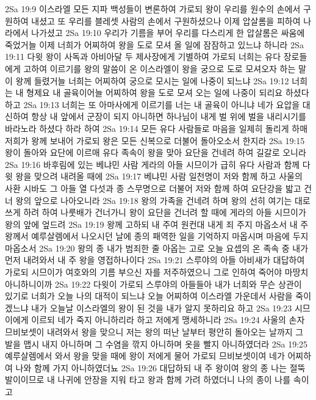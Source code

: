 2Sa 19:9  이스라엘 모든 지파 백성들이 변론하여 가로되 왕이 우리를 원수의 손에서 구원하여 내셨고 또 우리를 블레셋 사람의 손에서 구원하셨으나 이제 압살롬을 피하여 나라에서 나가셨고
2Sa 19:10  우리가 기름을 부어 우리를 다스리게 한 압살롬은 싸움에 죽었거늘 이제 너희가 어찌하여 왕을 도로 모셔 올 일에 잠잠하고 있느냐 하니라
2Sa 19:11  다윗 왕이 사독과 아비아달 두 제사장에게 기별하여 가로되 너희는 유다 장로들에게 고하여 이르기를 왕의 말씀이 온 이스라엘이 왕을 궁으로 도로 모셔오자 하는 말이 왕께 들렸거늘 너희는 어찌하여 궁으로 모시는 일에 나중이 되느냐
2Sa 19:12  너희는 내 형제요 내 골육이어늘 어찌하여 왕을 도로 모셔 오는 일에 나중이 되리요 하셨다 하고
2Sa 19:13  너희는 또 아마사에게 이르기를 너는 내 골육이 아니냐 네가 요압을 대신하여 항상 내 앞에서 군장이 되지 아니하면 하나님이 내게 벌 위에 벌을 내리시기를 바라노라 하셨다 하라 하여
2Sa 19:14  모든 유다 사람들로 마음을 일제히 돌리게 하매 저희가 왕께 보내어 가로되 왕은 모든 신복으로 더불어 돌아오소서 한지라
2Sa 19:15  왕이 돌아와 요단에 이르매 유다 족속이 왕을 맞아 요단을 건네려 하여 길갈로 오니라
2Sa 19:16  바후림에 있는 베냐민 사람 게라의 아들 시므이가 급히 유다 사람과 함께 다윗 왕을 맞으려 내려올 때에
2Sa 19:17  베냐민 사람 일천명이 저와 함께 하고 사울의 사환 시바도 그 아들 열 다섯과 종 스무명으로 더불어 저와 함께 하여 요단강을 밟고 건너 왕의 앞으로 나아오니라
2Sa 19:18  왕의 가족을 건네려 하며 왕의 선히 여기는 대로 쓰게 하려 하여 나룻배가 건너가니 왕이 요단을 건너려 할 때에 게라의 아들 시므이가 왕의 앞에 엎드려
2Sa 19:19  왕께 고하되 내 주여 원컨대 내게 죄 주지 마옵소서 내 주 왕께서 예루살렘에서 나오시던 날에 종의 패역한 일을 기억하지 마옵시며 마음에 두지 마옵소서
2Sa 19:20  왕의 종 내가 범죄한 줄 아옵는 고로 오늘 요셉의 온 족속 중 내가 먼저 내려와서 내 주 왕을 영접하나이다
2Sa 19:21  스루야의 아들 아비새가 대답하여 가로되 시므이가 여호와의 기름 부으신 자를 저주하였으니 그로 인하여 죽어야 마땅치 아니하니이까
2Sa 19:22  다윗이 가로되 스루야의 아들들아 내가 너희와 무슨 상관이 있기로 너희가 오늘 나의 대적이 되느냐 오늘 어찌하여 이스라엘 가운데서 사람을 죽이겠느냐 내가 오늘날 이스라엘의 왕이 된 것을 내가 알지 못하리요 하고
2Sa 19:23  시므이에게 이르되 네가 죽지 아니하리라 하고 저에게 맹세하니라
2Sa 19:24  사울의 손자 므비보셋이 내려와서 왕을 맞으니 저는 왕의 떠난 날부터 평안히 돌아오는 날까지 그 발을 맵시 내지 아니하며 그 수염을 깎지 아니하며 옷을 빨지 아니하였더라
2Sa 19:25  예루살렘에서 와서 왕을 맞을 때에 왕이 저에게 물어 가로되 므비보셋이여 네가 어찌하여 나와 함께 가지 아니하였더뇨
2Sa 19:26  대답하되 내 주 왕이여 왕의 종 나는 절뚝발이이므로 내 나귀에 안장을 지워 타고 왕과 함께 가려 하였더니 나의 종이 나를 속이고
